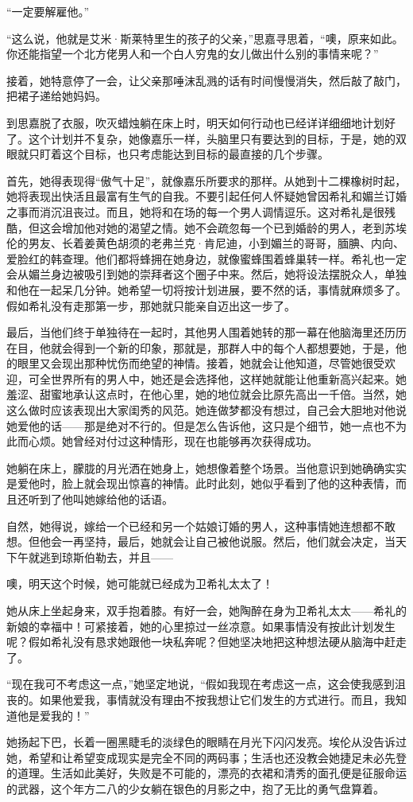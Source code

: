 \par “一定要解雇他。”
\par “这么说，他就是艾米·斯莱特里生的孩子的父亲，”思嘉寻思着，“噢，原来如此。你还能指望一个北方佬男人和一个白人穷鬼的女儿做出什么别的事情来呢？”
\par 接着，她特意停了一会，让父亲那唾沫乱溅的话有时间慢慢消失，然后敲了敲门，把裙子递给她妈妈。
\par 到思嘉脱了衣服，吹灭蜡烛躺在床上时，明天如何行动也已经详详细细地计划好了。这个计划并不复杂，她像嘉乐一样，头脑里只有要达到的目标，于是，她的双眼就只盯着这个目标，也只考虑能达到目标的最直接的几个步骤。
\par 首先，她得表现得“傲气十足”，就像嘉乐所要求的那样。从她到十二棵橡树时起，她将表现出快活且最富有生气的自我。不要引起任何人怀疑她曾因希礼和媚兰订婚之事而消沉沮丧过。而且，她将和在场的每一个男人调情逗乐。这对希礼是很残酷，但这会增加他对她的渴望之情。她不会疏忽每一个已到婚龄的男人，老到苏埃伦的男友、长着姜黄色胡须的老弗兰克·肯尼迪，小到媚兰的哥哥，腼腆、内向、爱脸红的韩查理。他们都将蜂拥在她身边，就像蜜蜂围着蜂巢转一样。希礼也一定会从媚兰身边被吸引到她的崇拜者这个圈子中来。然后，她将设法摆脱众人，单独和他在一起呆几分钟。她希望一切将按计划进展，要不然的话，事情就麻烦多了。假如希礼没有走那第一步，那她就只能亲自迈出这一步了。
\par 最后，当他们终于单独待在一起时，其他男人围着她转的那一幕在他脑海里还历历在目，他就会得到一个新的印象，那就是，那群人中的每个人都想要她，于是，他的眼里又会现出那种忧伤而绝望的神情。接着，她就会让他知道，尽管她很受欢迎，可全世界所有的男人中，她还是会选择他，这样她就能让他重新高兴起来。她羞涩、甜蜜地承认这点时，在他心里，她的地位就会比原先高出一千倍。当然，她这么做时应该表现出大家闺秀的风范。她连做梦都没有想过，自己会大胆地对他说她爱他的话——那是绝对不行的。但是怎么告诉他，这只是个细节，她一点也不为此而心烦。她曾经对付过这种情形，现在也能够再次获得成功。
\par 她躺在床上，朦胧的月光洒在她身上，她想像着整个场景。当他意识到她确确实实是爱他时，脸上就会现出惊喜的神情。此时此刻，她似乎看到了他的这种表情，而且还听到了他叫她嫁给他的话语。
\par 自然，她得说，嫁给一个已经和另一个姑娘订婚的男人，这种事情她连想都不敢想。但他会一再坚持，最后，她就会让自己被他说服。然后，他们就会决定，当天下午就逃到琼斯伯勒去，并且——
\par 噢，明天这个时候，她可能就已经成为卫希礼太太了！
\par 她从床上坐起身来，双手抱着膝。有好一会，她陶醉在身为卫希礼太太——希礼的新娘的幸福中！可紧接着，她的心里掠过一丝凉意。如果事情没有按此计划发生呢？假如希礼没有恳求她跟他一块私奔呢？但她坚决地把这种想法硬从脑海中赶走了。
\par “现在我可不考虑这一点，”她坚定地说，“假如我现在考虑这一点，这会使我感到沮丧的。如果他爱我，事情就没有理由不按我想让它们发生的方式进行。而且，我知道他是爱我的！”
\par 她扬起下巴，长着一圈黑睫毛的淡绿色的眼睛在月光下闪闪发亮。埃伦从没告诉过她，希望和让希望变成现实是完全不同的两码事；生活也还没教会她捷足未必先登的道理。生活如此美好，失败是不可能的，漂亮的衣裙和清秀的面孔便是征服命运的武器，这个年方二八的少女躺在银色的月影之中，抱了无比的勇气盘算着。


